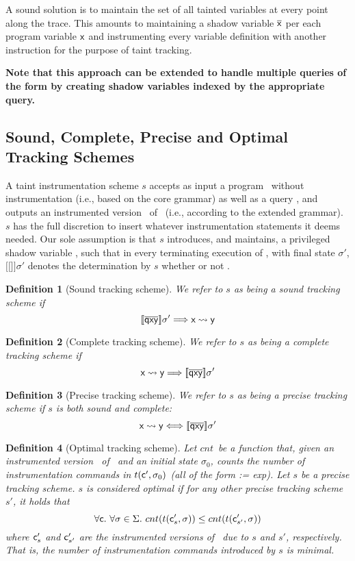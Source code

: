\documentclass[]{article}
\newcommand{\lsyn}{[\![}
\newcommand{\rsyn}{]\!]}
\newtheorem{defn}{Definition}
\newcommand{\jose}[1]{{\textbf{\color{blue} #1}}}
\begin{document}
A sound solution is to maintain the set of all tainted variables at every point along the trace. This amounts to maintaining a shadow variable $\overline{{\sf x}}$ per each program variable ${\sf x}$ and instrumenting every variable definition with another instruction for the purpose of taint tracking. 

\jose{Note that this approach can be extended to handle multiple queries of the form \query{\xvar}{\yvar} by creating shadow variables indexed by the appropriate query.}

\subsection{Sound, Complete, Precise and Optimal Tracking Schemes}

A taint instrumentation scheme $s$ accepts as input a program \prog\ without instrumentation (i.e., based on the core grammar) as well as a query \query{\xvar}{\yvar}, and outputs an instrumented version \progp\ of \prog\ (i.e., according to the extended grammar). $s$ has the full discretion to insert whatever instrumentation statements it deems needed. Our sole assumption is that $s$ introduces, and maintains, a privileged shadow variable
, such that in every terminating execution of \progp, with final state $\sigma'$, $\lsyn$$\rsyn \sigma'$ denotes the determination by $s$ whether or not \query{\xvar}{\yvar}.

\begin{defn}[Sound tracking scheme] We refer to $s$ as being a \emph{sound} tracking scheme if
	$$
		\lsyn \shadow{qxy} \rsyn \sigma' \Longrightarrow \query{\xvar}{\yvar}
	$$
\end{defn}

\begin{defn}[Complete tracking scheme] We refer to $s$ as being a \emph{complete} tracking scheme if
	$$
	\query{\xvar}{\yvar} \Longrightarrow \lsyn \shadow{qxy} \rsyn \sigma'
	$$
\end{defn}

\begin{defn}[Precise tracking scheme] We refer to $s$ as being a \emph{precise} tracking scheme if $s$ is both sound and complete:
	$$
	\query{\xvar}{\yvar} \Longleftrightarrow \lsyn \shadow{qxy} \rsyn \sigma'
	$$
\end{defn}

\newcommand{\cnt}{\ensuremath{cnt}}

\begin{defn}[Optimal tracking scheme] Let \cnt\ be a function that, given an instrumented version \progp\ of \prog\ and an initial state $\sigma_0$, 
	counts the number of instrumentation commands in $t({\sf c'},\sigma_0)$ (all of the form {\sf {} := exp}). Let $s$ be a precise tracking scheme. $s$ is considered \emph{optimal} if for any other precise tracking scheme $s'$,
	it holds that
	$$
		\forall \prog.\ \forall \sigma \in \Sigma.\ 
		\cnt(t(\prog'_s,\sigma)) \leq \cnt(t(\prog'_{s'},\sigma))
	$$
	where ${\sf c}'_s$ and ${\sf c}'_{s'}$ are the instrumented versions of \prog\ due to $s$ and $s'$, respectively.
	That is, the number of instrumentation commands introduced by $s$ is minimal.
\end{defn}
\end{document}

